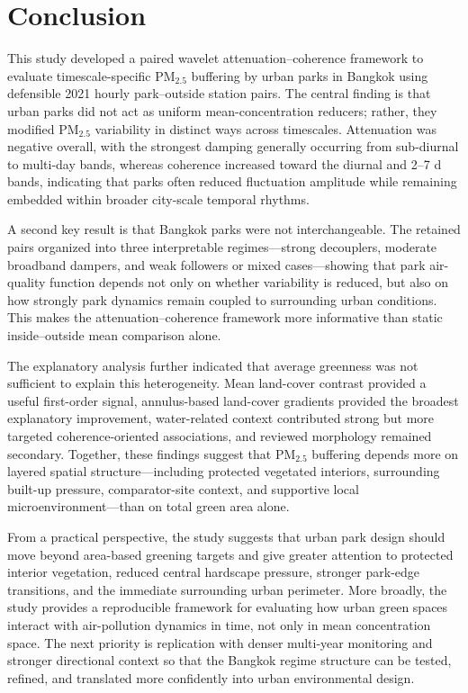 \section{Conclusion}

This study developed a paired wavelet attenuation--coherence framework to evaluate timescale-specific PM$_{2.5}$ buffering by urban parks in Bangkok using defensible 2021 hourly park--outside station pairs. The central finding is that urban parks did not act as uniform mean-concentration reducers; rather, they modified PM$_{2.5}$ variability in distinct ways across timescales. Attenuation was negative overall, with the strongest damping generally occurring from sub-diurnal to multi-day bands, whereas coherence increased toward the diurnal and 2--7 d bands, indicating that parks often reduced fluctuation amplitude while remaining embedded within broader city-scale temporal rhythms.

A second key result is that Bangkok parks were not interchangeable. The retained pairs organized into three interpretable regimes---strong decouplers, moderate broadband dampers, and weak followers or mixed cases---showing that park air-quality function depends not only on whether variability is reduced, but also on how strongly park dynamics remain coupled to surrounding urban conditions. This makes the attenuation--coherence framework more informative than static inside--outside mean comparison alone.

The explanatory analysis further indicated that average greenness was not sufficient to explain this heterogeneity. Mean land-cover contrast provided a useful first-order signal, annulus-based land-cover gradients provided the broadest explanatory improvement, water-related context contributed strong but more targeted coherence-oriented associations, and reviewed morphology remained secondary. Together, these findings suggest that PM$_{2.5}$ buffering depends more on layered spatial structure---including protected vegetated interiors, surrounding built-up pressure, comparator-site context, and supportive local microenvironment---than on total green area alone.

From a practical perspective, the study suggests that urban park design should move beyond area-based greening targets and give greater attention to protected interior vegetation, reduced central hardscape pressure, stronger park-edge transitions, and the immediate surrounding urban perimeter. More broadly, the study provides a reproducible framework for evaluating how urban green spaces interact with air-pollution dynamics in time, not only in mean concentration space. The next priority is replication with denser multi-year monitoring and stronger directional context so that the Bangkok regime structure can be tested, refined, and translated more confidently into urban environmental design.